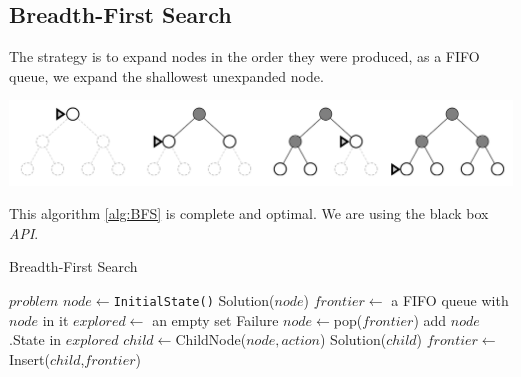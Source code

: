 \documentclass[10pt, letterpaper]{report}
\begin{document}
\subsection{Breadth-First Search}
The strategy is to expand nodes in the order they were produced, as a FIFO queue, we expand the shallowest unexpanded node.
\begin{center}
    \includegraphics[width=1\textwidth ]{images/bfs.png}
\end{center}
This algorithm \ref{alg:BFS} is complete and optimal. We are using the black box \textit{API}.

\begin{algorithm}
    \caption{Breadth-First Search}\label{alg:BFS}
    \begin{algorithmic}
    \Require $problem$
    \State $node\leftarrow$\texttt{InitialState()}
    \State\Return Solution($node$)
    \EndIf
    \State $frontier\leftarrow$ a FIFO queue with $node$ in it
    \State $explored\leftarrow$ an empty set
    \State\Return Failure
    \EndIf
    \State $node\leftarrow$pop($frontier$)
    \State add $node$.State in $explored$
    \State $child\leftarrow$ChildNode($node,action$)
    \State\Return Solution($child$)
    \EndIf
    \State $frontier\leftarrow$Insert($child$,$frontier$)
    \EndIf
    \EndFor
    \EndWhile
    \end{algorithmic}
\end{algorithm}
\end{document}
